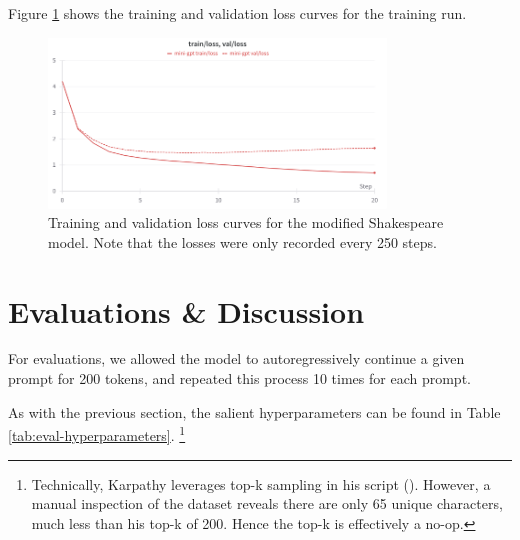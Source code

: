 \documentclass{article} %
\theoremstyle{definition}
\begin{document}
Figure \ref{fig:loss_curves} shows the training and validation loss curves
for the training run. 

\begin{figure}[h]
    \centering
    \includegraphics[width=0.8\textwidth, height=0.25\textheight]{images/loss_curves.png}
    \caption{Training and validation loss curves for the modified Shakespeare model.  Note that the losses were only recorded every 250 steps.}
    \label{fig:loss_curves}
\end{figure}

\section{Evaluations \& Discussion}

For evaluations, we allowed the model to autoregressively continue a given prompt
for 200 tokens, and repeated this process 10 times for each prompt.

As with the previous section, the salient hyperparameters can be found in 
Table \ref{tab:eval-hyperparameters}. \footnote{
    Technically, Karpathy leverages top-k sampling in his script (\cite{nanoGPT}).
    However, a manual inspection of the dataset reveals there are only 65 unique characters,
    much less than his top-k of 200. Hence the top-k is effectively a no-op.
}
\end{document}
